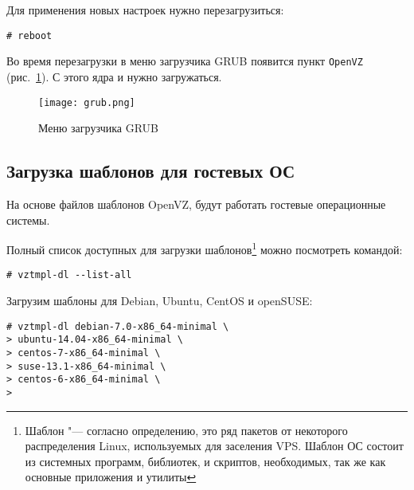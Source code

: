 Для применения новых настроек нужно перезагрузиться:
\begin{lstlisting}
# reboot
\end{lstlisting}

Во время перезагрузки в меню загрузчика GRUB появится пункт \texttt{OpenVZ} (рис.~\ref{pic:grub}).
С этого ядра и нужно загружаться.
\begin{figure}[ht]
    \centering
	\texttt{[image: grub.png]}
	\caption{Меню загрузчика GRUB}\label{pic:grub}
\end{figure}

\subsection{Загрузка шаблонов для гостевых ОС}

На основе файлов шаблонов OpenVZ, будут работать гостевые операционные системы.

Полный список доступных для загрузки шаблонов\footnote{Шаблон "--- согласно определению, это ряд пакетов от некоторого распределения Linux, используемых для заселения VPS.
Шаблон ОС состоит из системных программ, библиотек, и скриптов, необходимых, так же как основные приложения и утилиты} можно посмотреть командой:
\begin{lstlisting}
# vztmpl-dl --list-all
\end{lstlisting}

Загрузим шаблоны для Debian, Ubuntu, CentOS и openSUSE:
\begin{lstlisting}
# vztmpl-dl debian-7.0-x86_64-minimal \
> ubuntu-14.04-x86_64-minimal \
> centos-7-x86_64-minimal \
> suse-13.1-x86_64-minimal \
> centos-6-x86_64-minimal \
> 
\end{lstlisting}

\clearpage
